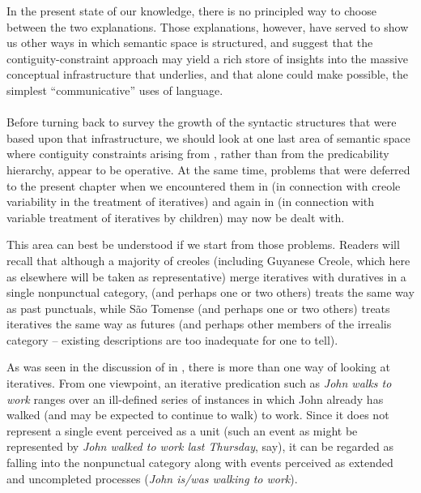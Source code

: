 In the present state of our knowledge, there is no principled way to choose between the two explanations. Those explanations, however, have served to show us other ways in which semantic space is struc\-tured, and suggest that the contiguity-constraint approach may yield a rich store of insights into the massive conceptual infrastructure that underlies, and that alone could make possible, the simplest ``communi\-cative'' uses of language.\\\\

Before turning back to survey the growth of the syntactic struc\-tures that were based upon that infrastructure, we should look at one last area of semantic space where contiguity constraints arising from , rather than from the predicability hierarchy, appear to be operative. At the same time, problems that were deferred to the present chapter when we encountered them in  (in connection with creole variability in the treatment of iteratives) and again in  (in connection with variable treatment of iteratives by children) may now be dealt with.

This area can best be understood if we start from those problems. Readers will recall that although a majority of creoles (including Guyanese Creole, which here as elsewhere will be taken as representative) merge iteratives with duratives in a single nonpunctual category,
 (and perhaps one or two others) treats  the same way as past punctuals, while S{\~a}o Tomense (and perhaps one or two others) treats iteratives the same way as futures (and perhaps other members of the irrealis category -- existing descriptions are too inadequate for one to tell).

As was seen in the discussion of \citet{BrockartEtAl1973} in , there is more than one way of looking at iteratives. From one viewpoint, an iterative predication such as \textit{John walks to work} ranges over an ill-defined series of instances in which John already has walked (and may be expected to continue to walk) to work. Since it does not represent a single event perceived as a unit (such an event as might be represented by \textit{John walked to work last Thursday}, say), it can be regarded as falling into the nonpunctual category along with events perceived as extended and uncompleted processes (\textit{John is/was walking to work}).


